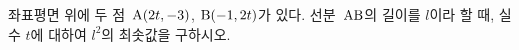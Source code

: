 좌표평면 위에 두 점~$\mathrm{A}(2t{,}\mkern3mu\mathopen{}-3)$, $\mathrm{B}(-1{,}\mkern3mu\mathopen{}2t)$가 있다. 선분~$\mathrm{AB}$의 길이를 $l$이라 할 때, 실수 $t$에 대하여 $l^2$의 최솟값을 구하시오.
